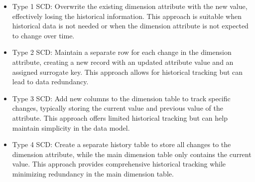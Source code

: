 \begin{itemize}
	\item Type 1 SCD: Overwrite the existing dimension attribute with the new value, effectively losing the historical information. This approach is suitable when historical data is not needed or when the dimension attribute is not expected to change over time.
	
	\item Type 2 SCD: Maintain a separate row for each change in the dimension attribute, creating a new record with an updated attribute value and an assigned surrogate key. This approach allows for historical tracking but can lead to data redundancy.
	
	\item Type 3 SCD: Add new columns to the dimension table to track specific changes, typically storing the current value and previous value of the attribute. This approach offers limited historical tracking but can help maintain simplicity in the data model.
	
	\item Type 4 SCD: Create a separate history table to store all changes to the dimension attribute, while the main dimension table only contains the current value. This approach provides comprehensive historical tracking while minimizing redundancy in the main dimension table.
\end{itemize}